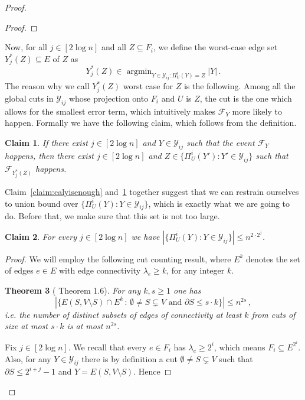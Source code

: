\documentclass[epsfig,letter,11pt]{article}
\numberwithin{equation}{section}
\newcommand{\uncutg}[1]{{\partial} #1}
\DeclareMathOperator*{\argmin}{argmin}
\newtheorem{theorem}{Theorem}[section]
\newtheorem{claim}[theorem]{Claim}
\begin{document}
\begin{proof}
\begin{proof}
\end{proof}
\noindent
Now, for all $j \in [2 \log n]$ and all $Z \subseteq F_i$, we define the worst-case edge set $Y^*_j(Z) \subseteq E$ of $Z$ as
\begin{equation*}
	Y^*_j(Z) \in \argmin_{Y \in \mathcal{Y}_{ij}: \Pi_U^i(Y) = Z}  |Y|\, .
\end{equation*}
The reason why we call $Y^*_j(Z)$ worst case for $Z$ is the following. Among all the global cuts in $\mathcal{Y}_{ij}$ whose projection onto $F_i$ and $U$ is $Z$,  the cut  is the one which allows for the smallest error term, which intuitively makes $\mathcal{F}_Y$ more likely to happen. Formally we have the following claim, which follows from the definition.

\begin{claim}
	\label{claim:worstcaseproj}
	If there exist $j \in [2\log n]$ and $Y \in \mathcal{Y}_{ij}$ such that the event $\mathcal{F}_{Y}$ happens, then there exist $j \in [2\log n]$ and $Z \in \{\Pi_U^i(Y'): Y' \in \mathcal{Y}_{ij}\}$ such that $\mathcal{F}_{Y_j^*(Z)}$ happens.
\end{claim}
\noindent
Claim~\ref{claim:calyisenough} and~\ref{claim:worstcaseproj} together suggest that we can restrain ourselves to union bound over $\{\Pi_U^i(Y): Y \in \mathcal{Y}_{ij}\}$, which is exactly what we are going to do. Before that, we make sure that this set is not too large.
\begin{claim}
	\label{claim:smallunionbound}
	For every $j \in [2\log n]$ we have $|\{\Pi_U^i(Y): Y \in \mathcal{Y}_{ij}\}| \le n^{2 \cdot 2^{j}}$.
\end{claim}
\begin{proof}
	We will employ the following cut counting result, where $E^k$ denotes the set of edges $e \in E$ with edge connectivity $\lambda_e \ge k$, for any integer $k$.
	\begin{theorem}[\cite{fungspars} Theorem 1.6]\label{th:counting}
		For any $k, s \ge 1$ one has
		\begin{equation*}
			|\{E(S,V\setminus S) \cap E^k \, : \, \emptyset \neq S \subsetneq V \text{ and } \uncutg{S} \le s\cdot k\}| \le n^{2s} \, ,
		\end{equation*}
		i.e. the number of distinct subsets of edges of connectivity at least $k$ from cuts of size at most $s \cdot k$ is at most $n^{2s}$.
	\end{theorem}
	\noindent
	Fix $j \in [2\log n]$. We recall that every $e \in F_i$ has $\lambda_e \ge 2^i$, which means $F_i \subseteq E^{2^{i}}$. Also, for any $Y \in \mathcal{Y}_{ij}$ there is by definition a cut $\emptyset \neq S \subsetneq V$ such that $\uncutg{S} \le 2^{i+j}-1$ and $Y=E(S,V\setminus S)$. Hence

\end{proof}
\end{proof}
\end{document}
